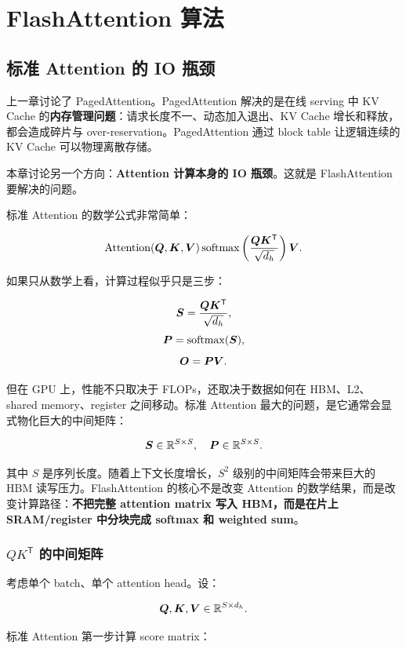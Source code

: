 \chapter{FlashAttention 算法}
\label{chap:flash-attention}

\section{标准 Attention 的 IO 瓶颈}
\label{sec:standard-attention-io-bottleneck}

上一章讨论了 PagedAttention。PagedAttention 解决的是在线 serving 中 KV Cache 的\textbf{内存管理问题}：请求长度不一、动态加入退出、KV Cache 增长和释放，都会造成碎片与 over-reservation。PagedAttention 通过 block table 让逻辑连续的 KV Cache 可以物理离散存储。

本章讨论另一个方向：\textbf{Attention 计算本身的 IO 瓶颈}。这就是 FlashAttention 要解决的问题。

标准 Attention 的数学公式非常简单：

\[
\operatorname{Attention}(\bm{Q},\bm{K},\bm{V})
\operatorname{softmax}
\left(
\frac{\bm{Q}\bm{K}^{\mathsf{T}}}{\sqrt{d_h}}
\right)
\bm{V}.
\]

如果只从数学上看，计算过程似乎只是三步：

\[
\bm{S}=\frac{\bm{Q}\bm{K}^{\mathsf{T}}}{\sqrt{d_h}},
\]
\[
\bm{P}=\operatorname{softmax}(\bm{S}),
\]
\[
\bm{O}=\bm{P}\bm{V}.
\]

但在 GPU 上，性能不只取决于 FLOPs，还取决于数据如何在 HBM、L2、shared memory、register 之间移动。标准 Attention 最大的问题，是它通常会显式物化巨大的中间矩阵：

\[
\bm{S}\in\mathbb{R}^{S\times S},
\quad
\bm{P}\in\mathbb{R}^{S\times S}.
\]

其中 $S$ 是序列长度。随着上下文长度增长，$S^2$ 级别的中间矩阵会带来巨大的 HBM 读写压力。FlashAttention 的核心不是改变 Attention 的数学结果，而是改变计算路径：\textbf{不把完整 attention matrix 写入 HBM，而是在片上 SRAM/register 中分块完成 softmax 和 weighted sum}。

\subsection{$QK^{\mathsf{T}}$ 的中间矩阵}
\label{subsec:qk-intermediate-matrix}

考虑单个 batch、单个 attention head。设：

\[
\bm{Q},\bm{K},\bm{V}\in\mathbb{R}^{S\times d_h}.
\]

标准 Attention 第一步计算 score matrix：

